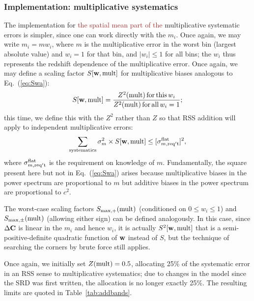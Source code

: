\documentclass[usenatbib]{mnras}
\newcommand{\changetext}[1]{\textcolor{brown}{#1}}
\begin{document}
\subsubsection{Implementation: multiplicative systematics}
\label{ss:implement-mult}

The implementation for \changetext{the spatial mean part of the} multiplicative systematic errors is simpler, since one can work directly with the $m_i$. Once again, we may write $m_i=mw_i$, where $m$ is the multiplicative error in the worst bin (largest absolute value) and $w_i=1$ for that bin, and $|w_i|\le 1$ for all bins; the $w_i$ thus represents the redshift dependence of the multiplicative error. Once again, we may define a scaling factor $S[{\bf w},{\rm mult}]$ for multiplicative biases analogous to Eq.~(\ref{eq:Swa}):
\begin{equation}
S[{\bf w},{\rm mult}] = \frac{Z^2({\rm mult}) \,{\rm for\,this\,}w_i}{Z^2({\rm mult})\,{\rm for\,all\,}w_i=1};
\end{equation}
this time, we define this with the $Z^2$ rather than $Z$ so that RSS addition will apply to independent multiplicative errors:
\begin{equation}
\sum_{\rm systematics} \sigma_m^2 \times S[{\bf w},{\rm mult}] \le [\sigma_{m,\rm req't}^{\rm flat}]^2,
\end{equation}
where $\sigma_{m,\rm req't}^{\rm flat}$ is the requirement on knowledge of $m$. Fundamentally, the square present here but not in Eq.~(\ref{eq:Swa}) arises because multiplicative biases in the power spectrum are proportional to $m$ but additive biases in the power spectrum are proportional to $c^2$.

The worst-case scaling factors $S_{\rm max,+}({\rm mult})$ (conditioned on $0\le w_i\le 1$) and $S_{\rm max,\pm}({\rm mult})$ (allowing either sign) can be defined analogously. In this case, since $\Delta{\bf C}$ is linear in the $m_i$ and hence $w_i$, it is actually $S^2[{\bf w},{\rm mult}]$ that is a semi-positive-definite quadratic function of ${\bf w}$ instead of $S$, but the technique of searching the corners by brute force still applies.

Once again, we initially set $Z({\rm mult})=0.5$, allocating 25\% of the systematic error in an RSS sense to multiplicative systematics; due to changes in the model since the SRD was first written, the allocation is no longer exactly 25\%. The resulting limits are quoted in Table~\ref{tab:addbands}.
\end{document}
